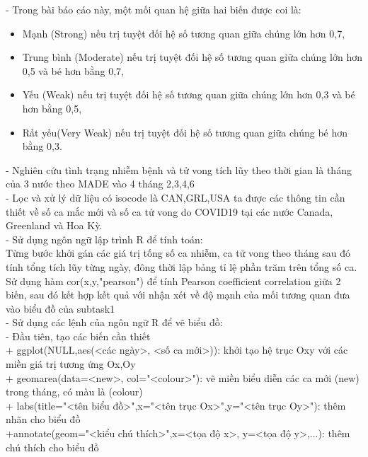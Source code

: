 \documentclass[a4paper]{article}
\theoremstyle{definition}
\begin{document}
\begin{enumerate}[i)]
		- Trong bài báo cáo này, một mối quan hệ giữa hai biến được coi là:\\
		\begin{itemize}
	    \item Mạnh (Strong) nếu trị tuyệt đối hệ số tương quan giữa chúng lớn hơn 0,7,\\
		\item Trung bình (Moderate) nếu trị tuyệt đối hệ số tương quan giữa chúng lớn hơn 0,5 và bé hơn bằng 0,7,\\
		\item Yếu (Weak) nếu trị tuyệt đối hệ số tương quan giữa chúng lớn hơn 0,3 và bé hơn bằng 0,5,\\
		\item Rất yếu(Very Weak) nếu trị tuyệt đối hệ số tương quan giữa chúng bé hơn bằng 0,3.\\
    	\end{itemize}
		
		- Nghiên cứu tình trạng nhiễm bệnh và tử vong tích lũy theo thời gian là tháng của 3 nước theo MADE vào 4 tháng 2,3,4,6\\
		
		- Lọc và xử lý dữ liệu có isocode là CAN,GRL,USA ta được các thông tin cần thiết về số ca mắc mới và số ca tử vong do COVID19 tại các nước Canada, Greenland và Hoa Kỳ.\\
		
		- Sử dụng ngôn ngữ lập trình R để tính toán:\\
		Từng bước khởi gán các giá trị tống số ca nhiễm, ca tử vong theo tháng sau đó tính tổng  tích lũy từng ngày, đông thời lập bảng tỉ lệ phần trăm trên tổng số ca.\\
		Sử dụng hàm cor(x,y,"pearson") để tính Pearson coefficient correlation giữa 2 biến, sau đó kết hợp kết quả với nhận xét về độ mạnh của mối tương quan đưa vào biểu đồ của subtask1\\
		
		- Sử dụng các lệnh của ngôn ngữ R để vẽ biểu đồ:\\
		- Đầu tiên, tạo các biến cần thiết\\
		+ ggplot(NULL,aes(<các ngày>, <số ca mới>)): khởi tạo hệ trục Oxy với các miền giá trị tương ứng Ox,Oy\\
		+ geomarea(data=<new>, col="<colour>"): vẽ miền biểu diễn các ca mới (new) trong tháng, có màu là (colour)\\
		+ labs(title="<tên biểu đồ>",x="<tên trục Ox>",y="<tên trục Oy>"): thêm nhãn cho biểu đồ\\
		+annotate(geom="<kiểu chú thích>",x=<tọa độ x>, y=<tọa độ y>,...): thêm chú thích cho biểu đồ\\
		

\end{enumerate}
\end{document}
